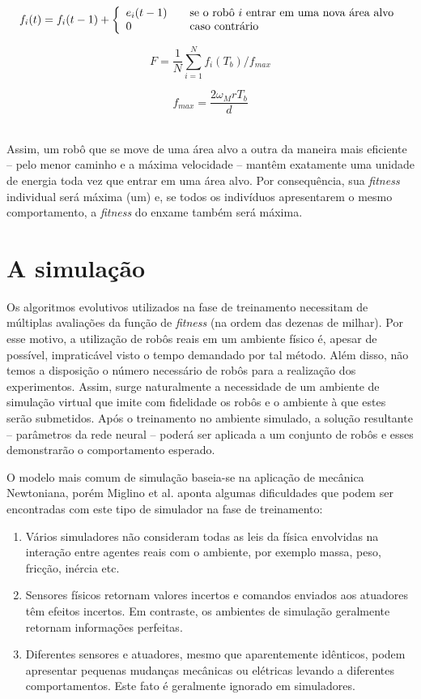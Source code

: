 $$
f_{i} (t) = f_{i} (t - 1) + \left\{
\begin{array}{l l}
e_{i}(t - 1) & \quad \text{se o robô $i$ entrar em uma nova área alvo}\\
0 & \quad \text{caso contrário}
\end{array} \right.
$$

\noindent\begin{minipage}{.5\linewidth}
$$
F = \frac{1}{N} \sum_{i=1}^{N} f_{i} (T_{b}) / f_{max}
$$
\end{minipage}%
\begin{minipage}{.5\linewidth}
$$
f_{max} = \frac{2 \omega_{M} r T_{b}}{d}
$$
\end{minipage}\\

Assim, um robô que se move de uma área alvo a outra da maneira mais eficiente -- pelo menor caminho e a máxima velocidade -- mantêm exatamente uma unidade de energia toda vez que entrar em uma área alvo. Por consequência, sua \textit{fitness} individual será máxima (um) e, se todos os indivíduos apresentarem o mesmo comportamento, a \textit{fitness} do enxame também será máxima.

\section{A simulação}

Os algoritmos evolutivos utilizados na fase de treinamento necessitam de múltiplas avaliações da função de \textit{fitness} (na ordem das dezenas de milhar). Por esse motivo, a utilização de robôs reais em um ambiente físico é, apesar de possível, impraticável visto o tempo demandado por tal método. Além disso, não temos a disposição o número necessário de robôs para a realização dos experimentos. Assim, surge naturalmente a necessidade de um ambiente de simulação virtual que imite com fidelidade os robôs e o ambiente à que estes serão submetidos. Após o treinamento no ambiente simulado, a solução resultante -- parâmetros da rede neural -- poderá ser aplicada a um conjunto de robôs e esses demonstrarão o comportamento esperado.

O modelo mais comum de simulação baseia-se na aplicação de mecânica Newtoniana, porém Miglino et al. \cite{miglino1996evolving} aponta algumas dificuldades que podem ser encontradas com este tipo de simulador na fase de treinamento:
\begin{enumerate}
    \item Vários simuladores não consideram todas as leis da física envolvidas na interação entre agentes reais com o ambiente, por exemplo massa, peso, fricção, inércia etc.
    \item Sensores físicos retornam valores incertos e comandos enviados aos atuadores têm efeitos incertos. Em contraste, os ambientes de simulação geralmente retornam informações perfeitas.
    \item Diferentes sensores e atuadores, mesmo que aparentemente idênticos, podem apresentar pequenas mudanças mecânicas ou elétricas levando a diferentes comportamentos. Este fato é geralmente ignorado em simuladores.
\end{enumerate}

